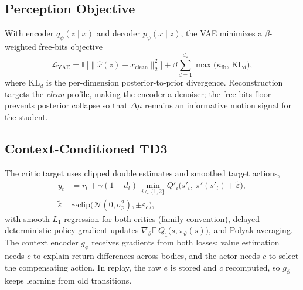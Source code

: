 \documentclass[journal]{IEEEtran}
\newcommand{\E}{\mathbb{E}}
\begin{document}
\subsection{Perception Objective}
With encoder $q_\psi(z \mid x)$ and decoder $p_\psi(x \mid z)$, the VAE
minimizes a $\beta$-weighted free-bits objective~\cite{Kingma2014VAE,
Higgins2017BetaVAE,Kingma2016IAF}
\begin{equation}
\mathcal{L}_{\mathrm{VAE}} = \E\big[\lVert \hat{x}(z) - x_{\mathrm{clean}}
\rVert_2^2\big] + \beta \sum_{d=1}^{d_z} \max\!\big(\kappa_{\mathrm{fb}},\,
\mathrm{KL}_d\big),
\label{eq:vae}
\end{equation}
where $\mathrm{KL}_d$ is the per-dimension posterior-to-prior divergence.
Reconstruction targets the \emph{clean} profile, making the encoder a
denoiser; the free-bits floor prevents posterior collapse so that
$\Delta\mu$ remains an informative motion signal for the student.

\subsection{Context-Conditioned TD3}
The critic target uses clipped double estimates and smoothed target actions,
\begin{align}
y_t &= r_t + \gamma (1 - d_t)\, \min_{i \in \{1,2\}}
Q'_i\big(s'_t,\, \pi'(s'_t) + \tilde{\varepsilon}\big),\\
\tilde{\varepsilon} &\sim \mathrm{clip}\big(\mathcal{N}(0, \sigma_p^2),
\pm \varepsilon_c\big),\nonumber
\end{align}
with smooth-$L_1$ regression for both critics (family convention), delayed
deterministic policy-gradient updates
$\nabla_{\vartheta} \E\, Q_1\big(s, \pi_\vartheta(s)\big)$, and Polyak
averaging. The context encoder $g_\phi$ receives gradients from both losses:
value estimation needs $c$ to explain return differences across bodies, and
the actor needs $c$ to select the compensating action. In replay, the raw
$e$ is stored and $c$ recomputed, so $g_\phi$ keeps learning from old
transitions.
\end{document}
